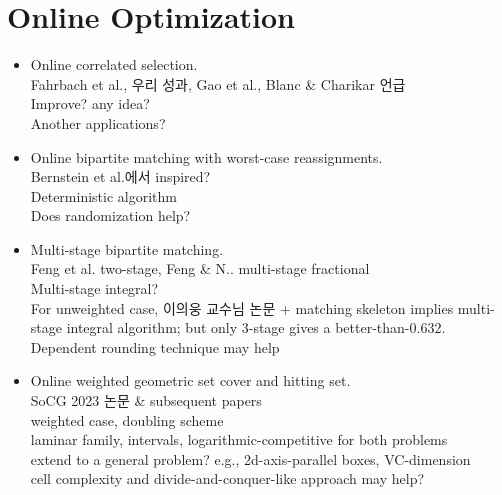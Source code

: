 \documentclass{article}
\begin{document}
\section{Online Optimization}
\begin{itemize}
\item Online correlated selection.\\
Fahrbach et al., 우리 성과, Gao et al., Blanc \& Charikar 언급\\
Improve? any idea? \\
Another applications?

\item Online bipartite matching with worst-case reassignments.\\
Bernstein et al.에서 inspired?\\
Deterministic algorithm\\
Does randomization help?

\item Multi-stage bipartite matching.\\
Feng et al. two-stage, Feng \& N.. multi-stage fractional\\
Multi-stage integral? \\
For unweighted case, 이의웅 교수님 논문 + matching skeleton implies multi-stage integral algorithm; but only 3-stage gives a better-than-0.632. \\
Dependent rounding technique may help

\item Online weighted geometric set cover and hitting set.\\
SoCG 2023 논문 \& subsequent papers\\
weighted case, doubling scheme\\
laminar family, intervals, logarithmic-competitive for both problems\\
extend to a general problem? e.g., 2d-axis-parallel boxes, VC-dimension\\
cell complexity and divide-and-conquer-like approach may help?
\end{itemize}
\end{document}
